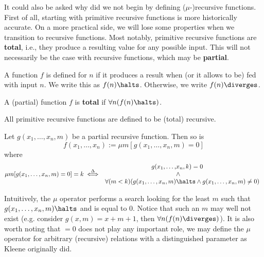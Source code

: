 \documentclass[../main.tex]{memoir}
\begin{document}
It could also be asked why did we not begin by defining ($\mu$-)recursive functions. First of all, starting with primitive recursive functions is more historically accurate. On a more practical side, we will lose some properties when we transition to recursive functions. Most notably, primitive recursive functions are \textbf{total}, i.e., they produce a resulting value for any possible input. This will not necessarily be the case with recursive functions, which may be \textbf{partial}.

\begin{definition}
  A function $f$ is defined for $n$ if it produces a result when (or it allows to be) fed with input $n$. We write this as $f(n) \halts$. Otherwise, we write $f(n) \diverges$.
\end{definition}

\begin{definition}
  A (partial) function $f$ is \textbf{total} if $\forall n (f(n) \halts)$.
\end{definition}

\begin{definition}
  All primitive recursive functions are defined to be (total) recursive.
\end{definition}

\begin{definition}[$\mu$-operator]
  Let $g(x_1, \ldots, x_n, m)$ be a partial recursive function. Then so is
  \[ f(x_1, \ldots, x_n) := \mu m [g(x_1, \ldots, x_n, m) = 0] \]
  where
  \begin{equation*}
    \mu m [g(x_1, \ldots, x_n, m) = 0] = k \overset{\Delta}{\iff}
    \begin{array}{r@{}l}
      g(x_1, \ldots, & x_n, k) = 0 \\
      & \land \\
      \forall (m < k) (g(x_1, \ldots, x_n, m) & \halts \land g(x_1, \ldots, x_n, m) \neq 0)
    \end{array}
  \end{equation*}
\end{definition}

\begin{remark}
  Intuitively, the $\mu$ operator performs a search looking for the least $m$ such that $g(x_1, \ldots, x_n, m) \halts$ and is equal to $0$. Notice that such an $m$ may well not exist (e.g. consider $g(x, m) = x + m + 1$, then $\forall n (f(n) \diverges)$). It is also worth noting that $= 0$ does not play any important role, we may define the $\mu$ operator for arbitrary (recursive) relations with a distinguished parameter as Kleene originally did. \cite{kleene}
\end{remark}
\end{document}

